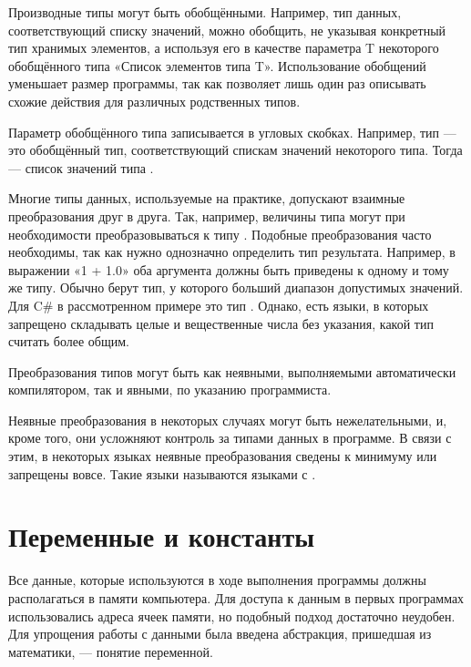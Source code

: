 
Производные типы могут быть обобщёнными. Например, тип данных,
соответствующий списку значений, можно обобщить, не указывая конкретный
тип хранимых элементов, а используя его в качестве параметра T
некоторого обобщённого типа «Список элементов типа T». Использование
обобщений уменьшает размер программы, так как позволяет лишь один раз
описывать схожие действия для различных родственных типов.

Параметр обобщённого типа записывается в угловых скобках. Например,
тип  — это обобщённый тип, соответствующий спискам значений
некоторого типа. Тогда  — список значений типа
.


Многие типы данных, используемые на практике, допускают взаимные
преобразования друг в друга. Так, например, величины типа 
могут при необходимости преобразовываться к типу
. Подобные преобразования часто необходимы, так как нужно
однозначно определить тип результата. Например, в выражении «1 + 1.0»
оба аргумента должны быть приведены к одному и тому же типу. Обычно
берут тип, у которого больший диапазон допустимых значений. Для C\# в
рассмотренном примере это тип . Однако, есть языки, в
которых запрещено складывать целые и вещественные числа без указания,
какой тип считать более общим.

Преобразования типов могут быть как неявными, выполняемыми
автоматически компилятором, так и явными, по указанию программиста.

Неявные преобразования в некоторых случаях могут быть нежелательными,
и, кроме того, они усложняют контроль за типами данных в программе.  В
связи с этим, в некоторых языках неявные преобразования сведены к
минимуму или запрещены вовсе. Такие языки называются языками с
.

\section{Переменные и константы}


Все данные, которые используются в ходе выполнения программы должны
располагаться в памяти компьютера. Для доступа к данным в первых
программах использовались адреса ячеек памяти, но подобный подход
достаточно неудобен. Для упрощения работы с данными была введена
абстракция, пришедшая из математики, — понятие переменной.

